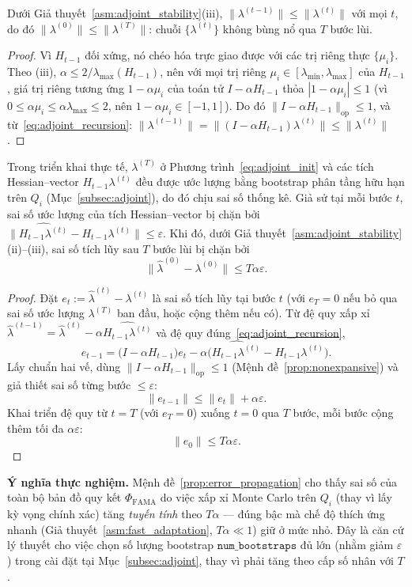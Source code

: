 \begin{proposition}
\label{prop:nonexpansive}
Dưới Giả thuyết~\ref{asm:adjoint_stability}(iii), $\|\lambda^{(t-1)}\| \le \|\lambda^{(t)}\|$ với mọi $t$, do đó $\|\lambda^{(0)}\| \le \|\lambda^{(T)}\|$: chuỗi $\{\lambda^{(t)}\}$ không bùng nổ qua $T$ bước lùi.
\end{proposition}
\begin{proof}
Vì $H_{t-1}$ đối xứng, nó chéo hóa trực giao được với các trị riêng thực $\{\mu_i\}$. Theo (iii), $\alpha \le 2/\lambda_{\max}(H_{t-1})$, nên với mọi trị riêng $\mu_i \in [\lambda_{\min}, \lambda_{\max}]$ của $H_{t-1}$, giá trị riêng tương ứng $1-\alpha\mu_i$ của toán tử $I-\alpha H_{t-1}$ thỏa $|1-\alpha\mu_i|\le 1$ (vì $0\le\alpha\mu_i\le\alpha\lambda_{\max}\le2$, nên $1-\alpha\mu_i\in[-1,1]$). Do đó $\|I-\alpha H_{t-1}\|_{\text{op}} \le 1$, và từ~\eqref{eq:adjoint_recursion}: $\|\lambda^{(t-1)}\| = \|(I-\alpha H_{t-1})\lambda^{(t)}\| \le \|\lambda^{(t)}\|$.
\end{proof}

\begin{proposition}
\label{prop:error_propagation}
Trong triển khai thực tế, $\lambda^{(T)}$ ở Phương trình~\eqref{eq:adjoint_init} và các tích Hessian–vector $H_{t-1}\lambda^{(t)}$ đều được ước lượng bằng bootstrap phân tầng hữu hạn trên $Q_i$ (Mục~\ref{subsec:adjoint}), do đó chịu sai số thống kê. Giả sử tại mỗi bước $t$, sai số ước lượng của tích Hessian–vector bị chặn bởi $\|\widehat{H_{t-1}\lambda^{(t)}} - H_{t-1}\lambda^{(t)}\| \le \varepsilon$. Khi đó, dưới Giả thuyết~\ref{asm:adjoint_stability}(ii)–(iii), sai số tích lũy sau $T$ bước lùi bị chặn bởi
\[
    \big\|\hat\lambda^{(0)} - \lambda^{(0)}\big\| \le T\alpha\varepsilon.
\]
\end{proposition}
\begin{proof}
Đặt $e_t := \hat\lambda^{(t)} - \lambda^{(t)}$ là sai số tích lũy tại bước $t$ (với $e_T=0$ nếu bỏ qua sai số ước lượng $\lambda^{(T)}$ ban đầu, hoặc cộng thêm nếu có). Từ đệ quy xấp xỉ $\hat\lambda^{(t-1)} = \hat\lambda^{(t)} - \alpha\widehat{H_{t-1}\lambda^{(t)}}$ và đệ quy đúng~\eqref{eq:adjoint_recursion},
\[
    e_{t-1} = \big(I-\alpha H_{t-1}\big)e_t - \alpha\big(\widehat{H_{t-1}\lambda^{(t)}} - H_{t-1}\lambda^{(t)}\big).
\]
Lấy chuẩn hai vế, dùng $\|I-\alpha H_{t-1}\|_{\text{op}}\le1$ (Mệnh đề~\ref{prop:nonexpansive}) và giả thiết sai số từng bước $\le\varepsilon$:
\[
    \|e_{t-1}\| \le \|e_t\| + \alpha\varepsilon.
\]
Khai triển đệ quy từ $t=T$ (với $e_T=0$) xuống $t=0$ qua $T$ bước, mỗi bước cộng thêm tối đa $\alpha\varepsilon$:
\[
    \|e_0\| \le T\alpha\varepsilon.
\]
\end{proof}

\textbf{Ý nghĩa thực nghiệm.} Mệnh đề~\ref{prop:error_propagation} cho thấy sai số của toàn bộ bản đồ quy kết $\Phi_{\text{FAMA}}$ do việc xấp xỉ Monte Carlo trên $Q_i$ (thay vì lấy kỳ vọng chính xác) tăng \emph{tuyến tính} theo $T\alpha$ — đúng bậc mà chế độ thích ứng nhanh (Giả thuyết~\ref{asm:fast_adaptation}, $T\alpha\ll1$) giữ ở mức nhỏ. Đây là căn cứ lý thuyết cho việc chọn số lượng bootstrap $\texttt{num\_bootstraps}$ đủ lớn (nhằm giảm $\varepsilon$) trong cài đặt tại Mục~\ref{subsec:adjoint}, thay vì phải tăng theo cấp số nhân với $T$.
